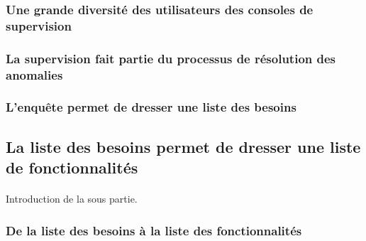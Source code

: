 		\subsubsection{Une grande diversité des utilisateurs des consoles de supervision}
			\paragraph{}
			
		\subsubsection{La supervision fait partie du processus de résolution des anomalies}
			\paragraph{}
			
		\subsubsection{L'enquête permet de dresser une liste des besoins}
			\paragraph{}%
			
			\paragraph{}%
	
	\subsection{La liste des besoins permet de dresser une liste de fonctionnalités}
		\paragraph{}
		Introduction de la sous partie.
		
		\subsubsection{De la liste des besoins à la liste des fonctionnalités}
			\paragraph{}%
			
